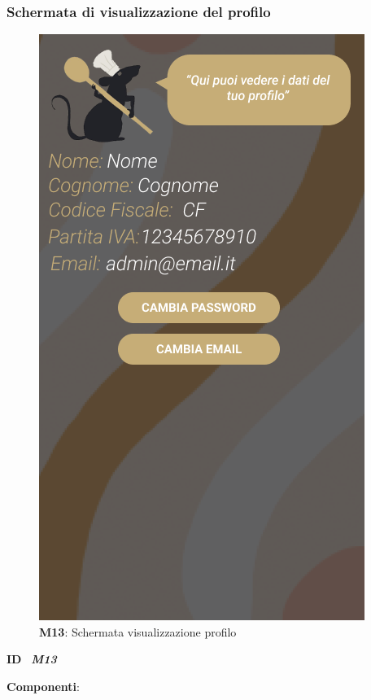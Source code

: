             \subsubsection{Schermata di visualizzazione del profilo}
              \begin{figure}[H]
                \centering
                \includegraphics[scale=0.5]{assets/Mockup/Mockup_Profile.png}
                \caption*{\textbf{M13}: Schermata visualizzazione profilo}\label{fig:Mockup_Profile}
              \end{figure}
    
              \begin{flushleft}
                \textbf{ID}   \ \Large{\textit{\textbf{M13}}}
              \end{flushleft}
    
              \textbf{Componenti}:
              
